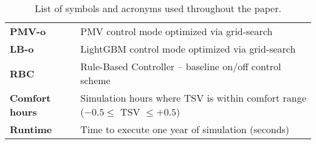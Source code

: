 \begin{table}[h!]
{\begin{tabular}{ll}
\textbf{PMV-o}        & PMV control mode optimized via grid-search \\
\textbf{LB-o}         & LightGBM control mode optimized via grid-search \\
\textbf{RBC}          & Rule-Based Controller – baseline on/off control scheme \\
\textbf{Comfort hours} & Simulation hours where TSV is within comfort range ($-0.5 \leq$ TSV $\leq +0.5$) \\
\textbf{Runtime}      & Time to execute one year of simulation (seconds) \\
\bottomrule
\end{tabular}
}
\caption{List of symbols and acronyms used throughout the paper.}
\end{table}

